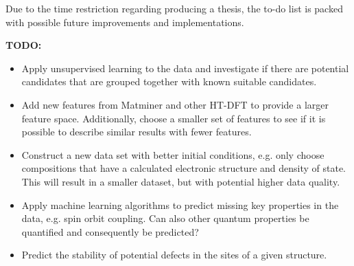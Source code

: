 Due to the time restriction regarding producing a thesis, the to-do list is packed with possible future improvements and implementations.
\vspace{10pt}

\textbf{TODO:}
\begin{itemize}
  \item Apply unsupervised learning to the data and investigate if there are potential candidates that are grouped together with known suitable candidates.
  \item Add new features from Matminer and other HT-DFT to provide a larger feature space. Additionally, choose a smaller set of features to see if it is possible to describe similar results with fewer features.
  \item Construct a new data set with better initial conditions, e.g. only choose compositions that have a calculated electronic structure and density of state. This will result in a smaller dataset, but with potential higher data quality.
  \item Apply machine learning algorithms to predict missing key properties in the data, e.g. spin orbit coupling. Can also other  quantum properties be quantified and consequently be predicted?
  \item Predict the stability of potential defects in the sites of a given structure.
\end{itemize}


